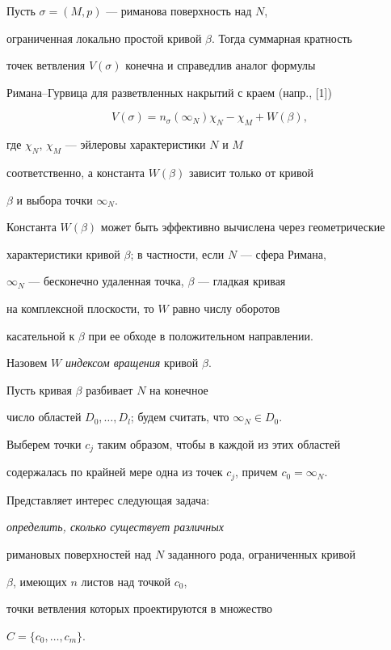 Пусть $\sigma=(M,p)$ --- риманова поверхность над $N$,


ограниченная локально простой кривой $\beta$. Тогда суммарная кратность


точек ветвления $V(\sigma)$ конечна и справедлив аналог формулы


Римана--Гурвица для разветвленных накрытий с краем (напр., [1])


$$


V(\sigma)=n_\sigma(\infty_N)\chi_{N}-\chi_M+W(\beta),


$$


где $\chi_N$, $\chi_M$ --- эйлеровы характеристики $N$ и $M$


соответственно, а константа $W(\beta)$ зависит только от кривой


$\beta$ и выбора точки $\infty_N$.


Константа $W(\beta)$ может быть эффективно вычислена через геометрические


характеристики кривой $\beta$; в частности, если $N$ --- сфера Римана,


$\infty_N$ --- бесконечно удаленная точка, $\beta$ --- гладкая кривая


на комплексной плоскости, то $W$ равно числу оборотов


касательной к $\beta$ при ее обходе в положительном направлении.


Назовем $W$ {\it индексом вращения} кривой $\beta$.





Пусть кривая $\beta$ разбивает $N$ на конечное


число областей $D_0,\dotsc,D_l$; будем считать, что $\infty_N\in D_0$.


Выберем точки $c_j$ таким образом, чтобы в каждой из этих областей


содержалась по крайней мере одна из точек $c_j$, причем $c_0=\infty_N$.


Представляет интерес следующая задача: {\it определить, сколько существует различных


римановых поверхностей над $N$ заданного рода, ограниченных кривой


$\beta$, имеющих $n$ листов над точкой $c_0$,


точки ветвления которых проектируются в множество


$C=\{c_0,\dotsc,c_m\}$.}





